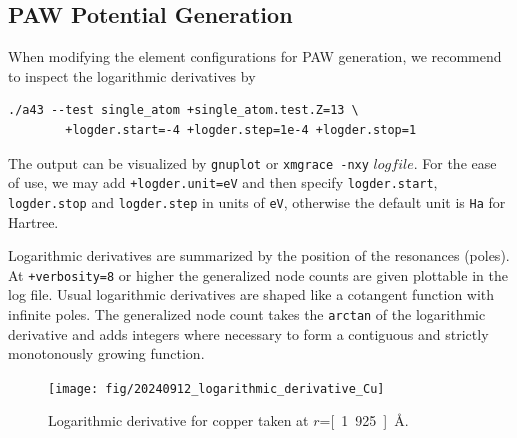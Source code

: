 \documentclass[oribibl]{llncs}
\newcommand{\ttt}[1]{\texttt{#1}}
\begin{document}
\subsection{PAW Potential Generation} \label{sec:single-atom}
%
When modifying the element configurations for \ac{PAW} generation,
we recommend to inspect the logarithmic derivatives by
\begin{verbatim}
./a43 --test single_atom +single_atom.test.Z=13 \
        +logder.start=-4 +logder.step=1e-4 +logder.stop=1
\end{verbatim}
The output can be visualized by \ttt{gnuplot} or \ttt{xmgrace -nxy} $logfile$.
%
\noindent
For the ease of use, we may add \ttt{+logder.unit=eV} and then specify
\ttt{logder.start}, \ttt{logder.stop} and \ttt{logder.step} in units of \ttt{eV}, otherwise the default unit is \ttt{Ha} for Hartree.

\noindent
Logarithmic derivatives are summarized by the position of the resonances (poles).
At \ttt{+verbosity=8} or higher the generalized node counts are given plottable in the log file.
Usual logarithmic derivatives are shaped like a cotangent function with infinite poles.
The generalized node count takes the \ttt{arctan} of the logarithmic derivative and adds integers where necessary to form a contiguous and strictly monotonously growing function.

\begin{figure}[h]
	\centering
	\texttt{[image: fig/20240912\_logarithmic\_derivative\_Cu]}
	\label{fig:logarithmic-derivative-Cu}
	\caption{Logarithmic derivative for copper taken at $r$=\unit[1.925]{\AA}. 
	         }
\end{figure}
\end{document}
